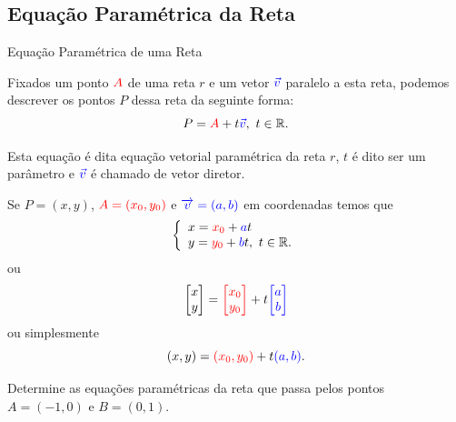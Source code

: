 

\subsection*{Equação Paramétrica da Reta}


\begin{frame}[label=retas]{Equação Paramétrica de uma Reta}

Fixados um ponto ${\color{red} A}$ de uma reta $r$ e um vetor ${\color{blue}\vec{v}}$ paralelo a esta reta, podemos descrever os pontos $P$ dessa reta da seguinte forma:
\[P={\color{red}A}+t{\color{blue}\vec{v}},\ t\in \mathbb{R}.\]
	\begin{center}
	\end{center}
	
Esta equação é dita {\color{blue} equação vetorial paramétrica da reta $r$}, $t$ é dito ser um {\color{blue}parâmetro} e ${\color{blue}\vec{v}}$ é chamado de {\color{blue}vetor diretor.}

\end{frame}

\begin{frame}[label=retas]
Se	$P=(x,y)$, $\textcolor{red}{A=(x_0,y_0)}$ e $\textcolor{blue}{\overrightarrow{v}=(a,b)}$
em coordenadas temos que
\[	\left\{\begin{array}{l}
	x=\textcolor{red}{x_0}+\textcolor{blue}{a}t\\
	y=\textcolor{red}{y_0}+\textcolor{blue}{b}t,\  t\in \mathbb{R}.
	\end{array}\right.\]
ou
\[
\begin{bmatrix} x \\ y\end{bmatrix}
={\color{red}\begin{bmatrix} x_0 \\ y_0 \end{bmatrix}}
+t{\color{blue}\begin{bmatrix} a \\ b \end{bmatrix}}
\]
ou simplesmente
\[
(x,y)={\color{red}(x_0,y_0)}+t{\color{blue}(a,b)}.
\]

\begin{exe}\label{exer4} \noindent
 Determine as equações paramétricas da reta que passa pelos pontos  $A=(-1,0)$ e $B=(0,1)$.
\end{exe}
\end{frame}
